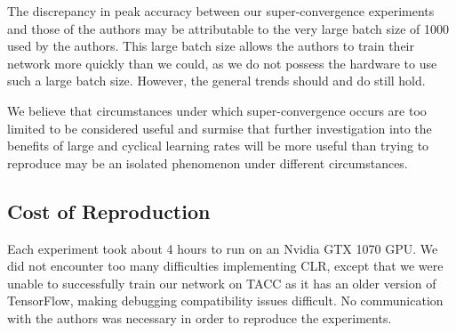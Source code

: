 \documentclass[10pt,twocolumn,letterpaper]{article}
\begin{document}
The discrepancy in peak accuracy between our super-convergence experiments and
those of the authors may be attributable to the very large batch size of 1000
used by the authors. This large batch size allows the authors to train their
network more quickly than we could, as we do not possess the hardware to use
such a large batch size. However, the general trends should and do still hold.

We believe that circumstances under which super-convergence occurs are too
limited to be considered useful and surmise that further investigation into the
benefits of large and cyclical learning rates will be more useful than trying
to reproduce may be an isolated phenomenon under different circumstances.

\subsection{Cost of Reproduction}
Each experiment took about 4 hours to run on an Nvidia GTX 1070 GPU. We did not
encounter too many difficulties implementing CLR, except that we were unable to
successfully train our network on TACC as it has an older version of
TensorFlow, making debugging compatibility issues difficult. No communication
with the authors was necessary in order to reproduce the experiments.

{\small


}
\end{document}
